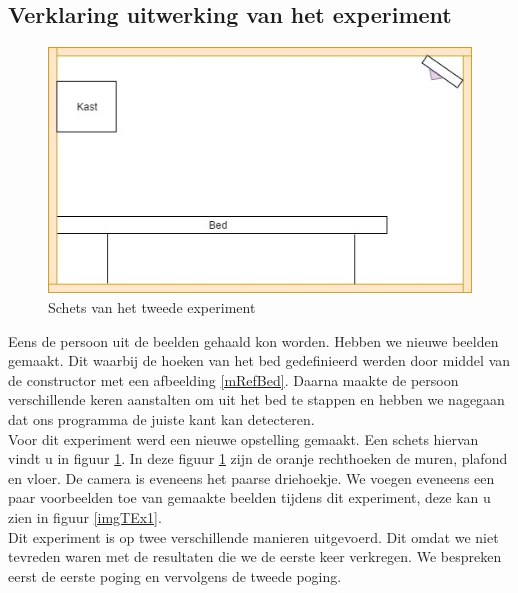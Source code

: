 \subsection{Verklaring uitwerking van het experiment}
\label{ERefDBV}
\begin{figure}[hbp]
	\includegraphics[scale=0.6]{SchetsExperimentTwee}
	\caption{Schets van het tweede experiment}
	\label{imgTEx}
\end{figure}
Eens de persoon uit de beelden gehaald kon worden. Hebben we nieuwe beelden gemaakt. Dit waarbij de hoeken van het bed gedefinieerd werden door middel van de constructor met een afbeelding \ref{mRefBed}. Daarna maakte de persoon verschillende keren aanstalten om uit het bed te stappen en hebben we nagegaan dat ons programma de juiste kant kan detecteren. \\
Voor dit experiment werd een nieuwe opstelling gemaakt. Een schets hiervan vindt u in figuur \ref{imgTEx}. In deze figuur \ref{imgTEx} zijn de oranje rechthoeken de muren, plafond en vloer. De camera is eveneens het paarse driehoekje. We voegen eveneens een paar voorbeelden toe van gemaakte beelden tijdens dit experiment, deze kan u zien in figuur \ref{imgTEx1}. \\
Dit experiment is op twee verschillende manieren uitgevoerd. Dit omdat we niet tevreden waren met de resultaten die we de eerste keer verkregen. We bespreken eerst de eerste poging en vervolgens de tweede poging. 
